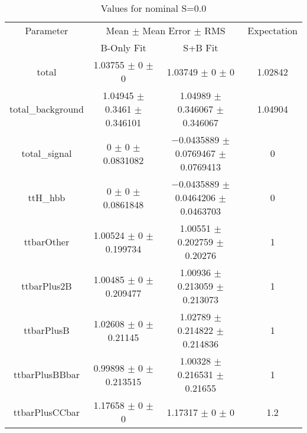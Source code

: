 \begin{table}
\centering
\caption{Values for nominal S=0.0}
\begin{tabular}{cccc}
\toprule
Parameter & \multicolumn{2}{c}{Mean $\pm$ Mean Error $\pm$ RMS} & Expectation\\
 & B-Only Fit & S+B Fit & \\
\midrule
total & \num{1.03755} $\pm$ \num{0} $\pm$ \num{0} & \num{1.03749} $\pm$ \num{0} $\pm$ \num{0} & \num{1.02842}\\
total\_background & \num{1.04945} $\pm$ \num{0.3461} $\pm$ \num{0.346101} & \num{1.04989} $\pm$ \num{0.346067} $\pm$ \num{0.346067} & \num{1.04904}\\
total\_signal & \num{0} $\pm$ \num{0} $\pm$ \num{0.0831082} & \num{-0.0435889} $\pm$ \num{0.0769467} $\pm$ \num{0.0769413} & \num{0}\\
ttH\_hbb & \num{0} $\pm$ \num{0} $\pm$ \num{0.0861848} & \num{-0.0435889} $\pm$ \num{0.0464206} $\pm$ \num{0.0463703} & \num{0}\\
ttbarOther & \num{1.00524} $\pm$ \num{0} $\pm$ \num{0.199734} & \num{1.00551} $\pm$ \num{0.202759} $\pm$ \num{0.20276} & \num{1}\\
ttbarPlus2B & \num{1.00485} $\pm$ \num{0} $\pm$ \num{0.209477} & \num{1.00936} $\pm$ \num{0.213059} $\pm$ \num{0.213073} & \num{1}\\
ttbarPlusB & \num{1.02608} $\pm$ \num{0} $\pm$ \num{0.21145} & \num{1.02789} $\pm$ \num{0.214822} $\pm$ \num{0.214836} & \num{1}\\
ttbarPlusBBbar & \num{0.99898} $\pm$ \num{0} $\pm$ \num{0.213515} & \num{1.00328} $\pm$ \num{0.216531} $\pm$ \num{0.21655} & \num{1}\\
ttbarPlusCCbar & \num{1.17658} $\pm$ \num{0} $\pm$ \num{0} & \num{1.17317} $\pm$ \num{0} $\pm$ \num{0} & \num{1.2}\\
\bottomrule
\end{tabular}
\end{table}
